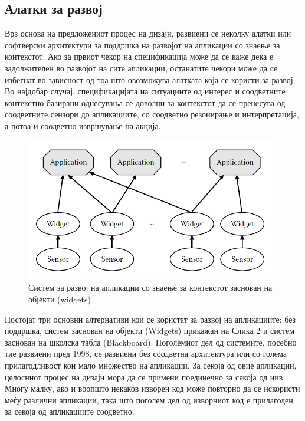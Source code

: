 \subsection{Алатки за развој}  

Врз основа на предложениот процес на дизајн, развиени се неколку алатки или
софтверски архитектури за поддршка на развојот на апликации со знаење за
контекстот. Ако за првиот чекор на спецификација може да се каже дека е
задолжителен во развојот на сите апликации, останатите чекори може да се
избегнат во зависност од тоа што овозможува алатката која се користи за развој.
Во најдобар случај, спецификацијата на ситуациите од интерес и соодветните
контекстно базирани однесувања се доволни за контекстот да се пренесува од
соодветните сензори до апликациите, со соодветно резонирање и интерпретација, а
потоа и соодветно извршување на акција.

\begin{figure}[htb]
\centering
\includegraphics[scale=0.4]{images/widget_based}
\caption{Систем за развој на апликации со знаење за контекстот заснован на
објекти (widgets)}
\label{fig:widget_based}
\end{figure}
 
Постојат три основни алтернативи кои се користат за развој на апликациите: без
поддршка, систем заснован на објекти (Widgets) прикажан на Слика 2 и систем
заснован на школска табла (Blackboard). Поголемиот дел од системите, посебно тие
развиени пред 1998, се развиени без соодветна архитектура или со голема
прилагодливост кон мало множество на апликации. За секоја од овие апликации,
целосниот процес на дизајн мора да се примени поединечно за секоја од нив. Многу
малку, ако и воопшто некаков изворен код може повторно да се искористи меѓу
различни апликации, така што поголем дел од изворниот код е прилагоден за секоја
од апликациите соодветно.

